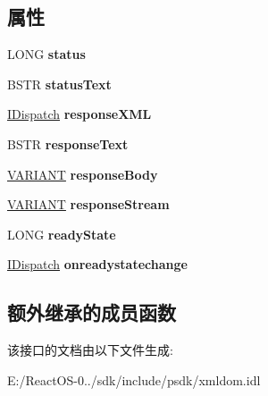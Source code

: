 \subsection*{属性}
\begin{DoxyCompactItemize}
\item 
\mbox{\label{interface_i_x_m_l_http_request_ab73850e839a2d787cd5d6ea198c40945}} 
L\+O\+NG {\bfseries status}
\item 
\mbox{\label{interface_i_x_m_l_http_request_a582a2fdeed82e4a58acdb3881023711d}} 
B\+S\+TR {\bfseries status\+Text}
\item 
\mbox{\label{interface_i_x_m_l_http_request_ada1aa2bc30a8267eaa19ad64b64e5814}} 
\hyperlink{interface_i_dispatch}{I\+Dispatch} {\bfseries response\+X\+ML}
\item 
\mbox{\label{interface_i_x_m_l_http_request_a09cefc96984c0d859b330f055d3b83d9}} 
B\+S\+TR {\bfseries response\+Text}
\item 
\mbox{\label{interface_i_x_m_l_http_request_a69937da05949288f9b770aed6657dc7e}} 
\hyperlink{structtag_v_a_r_i_a_n_t}{V\+A\+R\+I\+A\+NT} {\bfseries response\+Body}
\item 
\mbox{\label{interface_i_x_m_l_http_request_a4d5356e2b36cca002e3cad0abce86393}} 
\hyperlink{structtag_v_a_r_i_a_n_t}{V\+A\+R\+I\+A\+NT} {\bfseries response\+Stream}
\item 
\mbox{\label{interface_i_x_m_l_http_request_ab61e0726fe1cb2874bf2031d4b1832ad}} 
L\+O\+NG {\bfseries ready\+State}
\item 
\mbox{\label{interface_i_x_m_l_http_request_a8d58ac8779196365fa4c440032f6ed8a}} 
\hyperlink{interface_i_dispatch}{I\+Dispatch} {\bfseries onreadystatechange}
\end{DoxyCompactItemize}
\subsection*{额外继承的成员函数}


该接口的文档由以下文件生成\+:\begin{DoxyCompactItemize}
\item 
E\+:/\+React\+O\+S-\/0../sdk/include/psdk/xmldom.\+idl\end{DoxyCompactItemize}
